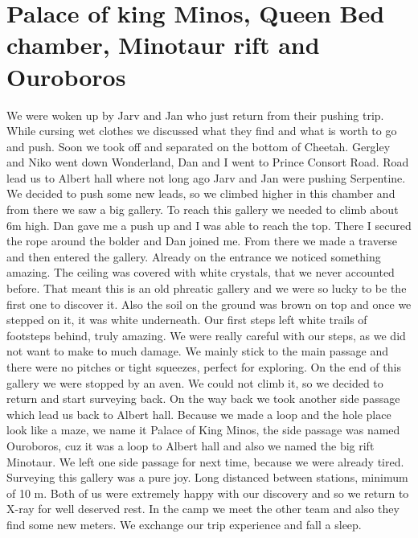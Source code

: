 \attrib{\izi}

\hypertarget{palace-of-king-minos-queen-bed-chamber-minotaur-rift-and-ouroboros}{%
\section{Palace of king Minos, Queen Bed chamber, Minotaur rift and
Ouroboros}\label{palace-of-king-minos-queen-bed-chamber-minotaur-rift-and-ouroboros}}

We were woken up by Jarv and Jan who just return from their pushing
trip. While cursing wet clothes we discussed what they find and what is
worth to go and push. Soon we took off and separated on the bottom of
Cheetah. Gergley and Niko went down Wonderland, Dan and I went to Prince
Consort Road. Road lead us to Albert hall where not long ago Jarv and
Jan were pushing Serpentine. We decided to push some new leads, so we
climbed higher in this chamber and from there we saw a big gallery. To
reach this gallery we needed to climb about 6m high. Dan gave me a push
up and I was able to reach the top. There I secured the rope around the
bolder and Dan joined me. From there we made a traverse and then entered
the gallery. Already on the entrance we noticed something amazing. The
ceiling was covered with white crystals, that we never accounted before.
That meant this is an old phreatic gallery and we were so lucky to be
the first one to discover it. Also the soil on the ground was brown on
top and once we stepped on it, it was white underneath. Our first steps
left white trails of footsteps behind, truly amazing. We were really
careful with our steps, as we did not want to make to much damage. We
mainly stick to the main passage and there were no pitches or tight
squeezes, perfect for exploring. On the end of this gallery we were
stopped by an aven. We could not climb it, so we decided to return and
start surveying back. On the way back we took another side passage which
lead us back to Albert hall. Because we made a loop and the hole place
look like a maze, we name it Palace of King Minos, the side passage was
named Ouroboros, cuz it was a loop to Albert hall and also we named the
big rift Minotaur. We left one side passage for next time, because we
were already tired. Surveying this gallery was a pure joy. Long
distanced between stations, minimum of 10 m. Both of us were extremely
happy with our discovery and so we return to X-ray for well deserved
rest. In the camp we meet the other team and also they find some new
meters. We exchange our trip experience and fall a sleep.

